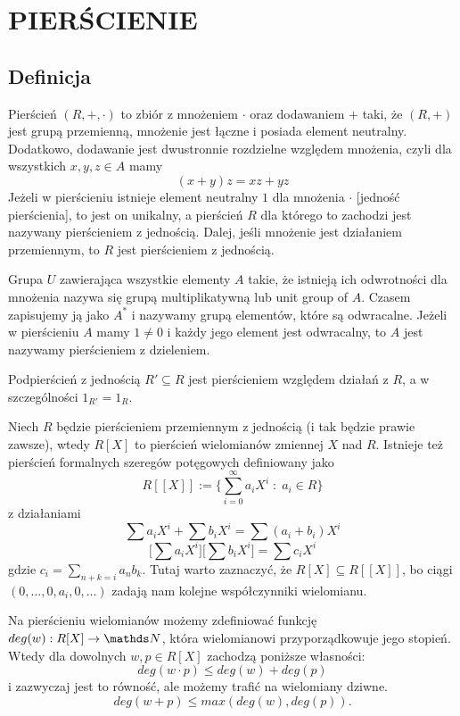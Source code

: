\section{PIERŚCIENIE}

\subsection{Definicja}

{\color{def}Pierścień} $(R, +, \cdot)$ to zbiór z mnożeniem $\cdot$ oraz dodawaniem $+$ taki, że $(R, +)$ jest grupą przemienną, mnożenie jest łączne i posiada element neutralny. Dodatkowo, dodawanie jest dwustronnie rozdzielne względem mnożenia, czyli dla wszystkich $x,y,z\in A$ mamy
$$(x+y)z=xz+yz$$
Jeżeli w pierścieniu istnieje element neutralny $1$ dla mnożenia $\cdot$ [jedność pierścienia], to jest on unikalny, a pierścień $R$ dla którego to zachodzi jest nazywany {\color{def}pierścieniem z jednością}. Dalej, jeśli mnożenie jest działaniem przemiennym, to $R$ jest {\color{def}pierścieniem z jednością}.
\smallskip

Grupa $U$ zawierająca wszystkie elementy $A$ takie, że istnieją ich odwrotności dla mnożenia nazywa się {\color{def}grupą multiplikatywną} lub {\color{acc}unit group of $A$}. Czasem zapisujemy ją jako $A^*$ i nazywamy grupą elementów, które są {\color{acc}odwracalne}. Jeżeli w pierścieniu $A$ mamy $1\neq0$ i każdy jego element jest odwracalny, to $A$ jest nazywamy {\color{def}pierścieniem z dzieleniem}.
\medskip

{\color{def}Podpierścień} z jednością $R'\subseteq R$ jest pierścieniem względem działań z $R$, a w szczególności $1_{R'}=1_R$.
\bigskip

\bigskip

Niech $R$ będzie pierścieniem przemiennym z jednością (i tak będzie prawie zawsze), wtedy $R[X]$ to pierścień wielomianów zmiennej $X$ nad $R$. Istnieje też {\color{def}pierścień formalnych szeregów potęgowych} definiowany jako
$$R[[X]]:=\{\sum\limits_{i=0}^\infty a_iX^i\;:\;a_i\in R\}$$
z działaniami
$$\sum a_iX^i+\sum b_iX^i=\sum(a_i+b_i)X^i$$
$$\Big[\sum a_iX^i\Big]\Big[\sum b_iX^i\Big]=\sum c_iX^i$$
gdzie $c_i=\sum\limits_{n+k=i}a_nb_k$. Tutaj warto zaznaczyć, że $R[X]\subseteq R[[X]]$, bo ciągi $(0,...,0,a_i,0,...)$ zadają nam kolejne współczynniki wielomianu.

Na pierścieniu wielomianów możemy zdefiniować funkcję $deg(w):R[X]\to \N$, która wielomianowi przyporządkowuje jego stopień. Wtedy dla dowolnych $w,p\in R[X]$ zachodzą poniższe własności:
$$deg(w\cdot p)\leq deg(w)+deg(p)$$
i zazwyczaj jest to równość, ale możemy trafić na wielomiany dziwne.
$$deg(w+p)\leq max(deg(w), deg(p)).$$

